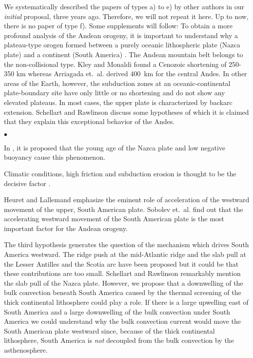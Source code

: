 \documentclass[twoside,10pt]{article}
\newenvironment{dlist}
   {\begin{list}
      {$\bullet$}
      {
      \setlength{\topsep}{0.5ex}
      \setlength{\partopsep}{0.0ex}
      \setlength{\parsep}{0.5ex}
      \setlength{\itemsep}{0.0ex}
      \setlength{\itemindent}{3.0ex}
      \setlength{\leftmargin}{0.0ex}
      \setlength{\labelsep}{1.0ex}
      }
   }
   {\end{list}}
\begin{document}
We systematically described the papers of types a) to e) by other authors in our \emph{initial} proposal, three years ago. 
Therefore, we will not repeat it here.
Up to now, there is no paper of type f). 
Some supplements will follow: To obtain a more profound analysis of the Andean orogeny, it is important to understand why a plateau-type orogen formed between a purely oceanic lithospheric plate (Nazca plate) and a continent (South America) \cite{Oncken2006}. 
The Andean mountain belt belongs to the non-collisional type. 
Kley and Monaldi \cite{Kley1998,Kley1999,Kley2002} found a Cenozoic shortening of 250-350 km whereas Arriagada et.~al. \cite{Arriagada2008} derived 400~km for the central Andes. 
In other areas of the Earth, however, the subduction zones at an oceanic-continental plate-boundary site have only little or no shortening and do not show any elevated plateaus. 
In most cases, the upper plate is characterized by backarc extension. 
Schellart and Rawlinson \cite{Schellart2010} discuss some hypotheses of which it is claimed that they explain this exceptional behavior of the Andes.
\begin{dlist}
 \item In \cite{Molnar1978}, it is proposed that the young age of the Nazca plate and low negative buoyancy cause this phenomenon.
 \item Climatic conditions, high friction and subduction erosion is thought to be the decisive factor \cite{Lamb2003,Kukowski2006}.
 \item Heuret and Lallemand \cite{Heuret2005} emphasize the eminent role of acceleration of the westward movement of the upper, South American plate.
Sobolev et.~al. \cite{Sobolev2006} find out that the accelerating westward movement of the South American plate is the most important factor for the Andean orogeny. 
\end{dlist}
The third hypothesis generates the question of the mechanism which drives South America westward. 
The ridge push at the mid-Atlantic ridge and the slab pull at the Lesser Antilles and the Scotia arc have been proposed but it could be that these contributions are too small. 
Schellart and Rawlinson \cite{Schellart2010} remarkably mention the slab pull of the Nazca plate.
However, we propose that a downwelling of the bulk convection beneath South America caused by the thermal screening of the thick continental lithosphere could play a role. 
If there is a large upwelling east of South America and a large downwelling of the bulk convection under South America we could understand why the bulk convection current would move the South American plate westward since, because of the thick continental lithosphere, South America is \emph{not} decoupled from the bulk convection by the asthenosphere. 
\end{document}
